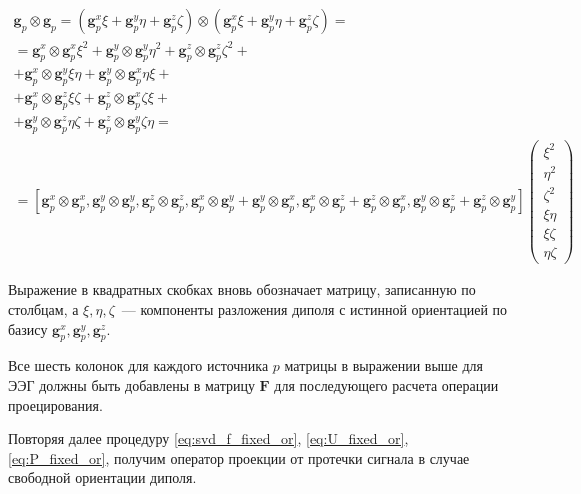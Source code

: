 \begin{multline}
    \mathbf{g}_p \otimes \mathbf{g}_p = (\mathbf{g}_p^x \xi
    + \mathbf{g}_p^y \eta
    + \mathbf{g}_p^z \zeta)
    \otimes
    (\mathbf{g}_p^x \xi
    + \mathbf{g}_p^y \eta
    + \mathbf{g}_p^z \zeta) =
    \nonumber \\
    = \mathbf{g}_p^x \otimes \mathbf{g}_p^x \xi^2
    + \mathbf{g}_p^y \otimes \mathbf{g}_p^y \eta^2
    + \mathbf{g}_p^z \otimes \mathbf{g}_p^z \zeta^2+\\
    + \mathbf{g}_p^x \otimes \mathbf{g}_p^y \xi \eta
    + \mathbf{g}_p^y\otimes  \mathbf{g}_p^x \eta \xi+\\
    + \mathbf{g}_p^x \otimes \mathbf{g}_p^z \xi \zeta
    + \mathbf{g}_p^z\otimes  \mathbf{g}_p^x \zeta \xi+\\
    + \mathbf{g}_p^y \otimes \mathbf{g}_p^z \eta \zeta
    + \mathbf{g}_p^z \otimes \mathbf{g}_p^y \zeta \eta
    =\\
    =  [\mathbf{g}_p^x \otimes \mathbf{g}_p^x,
        \mathbf{g}_p^y \otimes \mathbf{g}_p^y,
        \mathbf{g}_p^z \otimes \mathbf{g}_p^z,
        \mathbf{g}_p^x \otimes \mathbf{g}_p^y
        + \mathbf{g}_p^y \otimes \mathbf{g}_p^x,
        \mathbf{g}_p^x \otimes \mathbf{g}_p^z
        + \mathbf{g}_p^z \otimes \mathbf{g}_p^x,
        \mathbf{g}_p^y \otimes \mathbf{g}_p^z
        + \mathbf{g}_p^z \otimes \mathbf{g}_p^y]
        \left( \begin{array}{ccc}
                \xi^2 \\
                \eta^2 \\
                \zeta^2 \\
                \xi \eta \\
                \xi \zeta \\
                \eta \zeta
            \end{array}
        \right)
\end{multline}

Выражение в квадратных скобках вновь обозначает матрицу, записанную по столбцам,
а $\xi, \eta, \zeta$~--- компоненты разложения диполя с истинной ориентацией по базису
$\mathbf{g}_p^x,\mathbf{g}_p^y,\mathbf{g}_p^z$.

Все шесть колонок для каждого источника $p$ матрицы в выражении выше для ЭЭГ должны быть добавлены
в матрицу $\mathbf{F}$ для последующего расчета операции проецирования.

Повторяя далее процедуру \ref{eq:svd_f_fixed_or}, \ref{eq:U_fixed_or}, \ref{eq:P_fixed_or}, получим
оператор проекции от протечки сигнала в случае свободной ориентации диполя.

